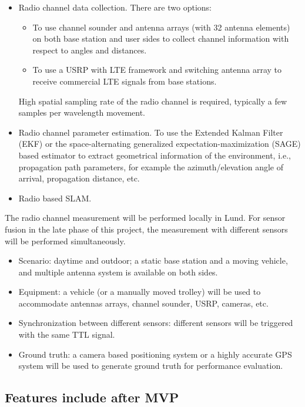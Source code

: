 \begin{itemize}
\item Radio channel data collection. There are two options: 
  \begin{itemize}
  \item To use channel sounder and antenna arrays (with 32 antenna elements) on both base station and user sides to collect channel information with respect to angles and distances.
  \item To use a USRP with \gls{LTE} framework and switching antenna array to 
  receive commercial LTE signals from base stations.
  \end{itemize}
High spatial sampling rate of the radio channel is required, typically a few samples per wavelength movement. 
\item Radio channel parameter estimation. To use the Extended Kalman Filter (EKF) or the space-alternating generalized expectation-maximization (SAGE) based estimator to extract geometrical information of the environment, i.e., propagation path parameters, for example the azimuth/elevation angle of arrival, propagation distance, etc. 
\item Radio based SLAM. 
\end{itemize}

The radio channel measurement will be performed locally in Lund. For sensor fusion in the late phase of this project, the measurement with different sensors will be performed simultaneously. 
\begin{itemize}
\item Scenario: daytime and outdoor; a static base station and a moving vehicle, and multiple antenna system is available on both sides. 
\item Equipment: a vehicle (or a manually moved trolley) will be used to accommodate antennas arrays, channel sounder, USRP, cameras, etc.
\item Synchronization between different sensors: different sensors will be triggered with the same TTL signal.
\item Ground truth: a camera based positioning system or a highly accurate GPS system will be used to generate ground truth for performance evaluation.     
\end{itemize}


\subsection{Features include after MVP}\label{sec:features}

